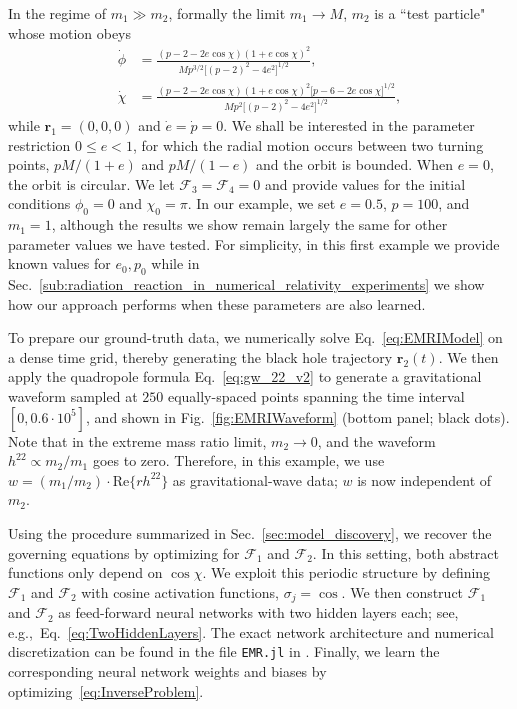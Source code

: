 \documentclass[ reprint,
nofootinbib,
 amsmath,amssymb,
 aps,
]{revtex4-2}
\begin{document}
In the regime of $m_1 \gg m_2$, formally the limit $m_1 \rightarrow M$, $m_2$ is a ``test particle"
whose motion obeys~\cite{chandrasekhar1998mathematical,cutler1994gravitational,martel2004gravitational,field2009discontinuous}
\begin{subequations}
\label{eq:EMRIModel}
\begin{align}
	\dot{\phi}
		&=
	\frac{(p-2-2e\cos\chi)(1+e\cos\chi)^2}{Mp^{3/2}\big[(p-2)^2-4e^2\big]^{1/2}}
	,
	\\
	\dot{\chi}
		&=
	\frac{(p-2-2e\cos\chi)(1+e\cos\chi)^2\big[p-6-2e\cos\chi\big]^{1/2}}{Mp^2 \big[(p-2)^2-4e^2\big]^{1/2}}
	,
\end{align}
\end{subequations}
while $\mathbf{r}_1 = (0,0,0)$ and $\dot{e}=\dot{p}=0$.
We shall be interested in the
parameter restriction $0\leq e <1$, for which the radial motion occurs between two
turning points, $pM/(1+e)$ and $pM/(1-e)$ and the orbit is bounded.
When $e = 0$, the orbit is circular.
We let $\mathcal{F}_3 = \mathcal{F}_4 = 0$ and 
provide values for the initial conditions $\phi_0 = 0$ and $\chi_0 = \pi$.
In our example, we set $e = 0.5$, $p = 100$, and $m_1 = 1$, although the results we show 
remain largely the same for other parameter values we have tested. For simplicity, in this
first example we provide known values for $e_0, p_0$ while 
in Sec.~\ref{sub:radiation_reaction_in_numerical_relativity_experiments} we show how
our approach performs when these parameters are also learned. 

To prepare our ground-truth data, 
we numerically solve Eq.~\eqref{eq:EMRIModel} on a dense time grid, thereby 
generating the black hole trajectory $\mathbf{r}_2(t)$. 
We then apply the quadropole formula Eq.~\eqref{eq:gw_22_v2} to generate a gravitational waveform
sampled at $250$ equally-spaced points spanning the time interval $[0, 0.6\cdot 10^5]$,
and shown in Fig.~\ref{fig:EMRIWaveform} (bottom panel; black dots).
Note that in the extreme mass ratio limit,
$m_2 \rightarrow 0$, and the waveform $h^{22} \propto m_2 / m_1$
goes to zero.
Therefore, in this example, we use 
$w = (m_1/m_2) \cdot \mathrm{Re}\{rh^{22}\}$ as gravitational-wave data;
$w$ is now independent of $m_2$.



Using the procedure summarized in Sec.~\ref{sec:model_discovery},
we recover the governing equations by optimizing for $\mathcal{F}_1$ and $\mathcal{F}_2$.
In this setting, both abstract functions only depend on $\cos\chi$.
We exploit this periodic structure by defining $\mathcal{F}_1$ and $\mathcal{F}_2$ with cosine activation functions, $\sigma_j = \cos$.
We then construct $\mathcal{F}_1$ and $\mathcal{F}_2$ as feed-forward neural networks with two hidden layers each; see, e.g.,~Eq.~\cref{eq:TwoHiddenLayers}.
The exact network architecture and numerical discretization can be found in the file \texttt{EMR.jl} in \cite{JuliaCode}.
Finally, we learn the corresponding neural network weights and biases by optimizing~\cref{eq:InverseProblem}.
\end{document}
